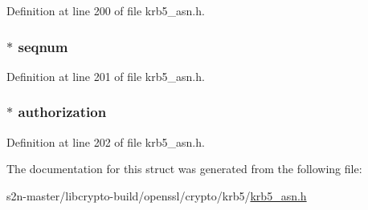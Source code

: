Definition at line 200 of file krb5\+\_\+asn.\+h.

\subsubsection[{\texorpdfstring{seqnum}{seqnum}}]{ $\ast$ seqnum}\hypertarget{structkrb5__authenticator__st_a7ffb86e0e335fab7dbaa7167d9f8823b}{}\label{structkrb5__authenticator__st_a7ffb86e0e335fab7dbaa7167d9f8823b}


Definition at line 201 of file krb5\+\_\+asn.\+h.

\subsubsection[{\texorpdfstring{authorization}{authorization}}]{ $\ast$ authorization}\hypertarget{structkrb5__authenticator__st_abcc2b77fcfc60c1ffcfa0c935813a49a}{}\label{structkrb5__authenticator__st_abcc2b77fcfc60c1ffcfa0c935813a49a}


Definition at line 202 of file krb5\+\_\+asn.\+h.



The documentation for this struct was generated from the following file\+:\begin{DoxyCompactItemize}
\item 
s2n-\/master/libcrypto-\/build/openssl/crypto/krb5/\hyperlink{crypto_2krb5_2krb5__asn_8h}{krb5\+\_\+asn.\+h}\end{DoxyCompactItemize}
